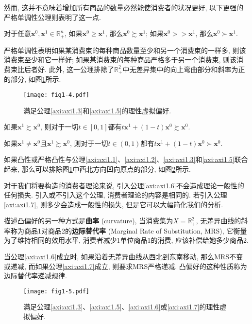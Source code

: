 \documentclass[cn, 12pt, math=mtpro2, bibstyle=apa, blue]{elegantbook}
\newcommand{\R}{\mathbb{R}}
\newcommand{\x}{\mathbf{x}}
\begin{document}
然而, 这并不意味着增加所有商品的数量必然能使消费者的状况更好, 以下更强的严格单调性公理则表明了这一点.

\begin{axiom}[严格单调性]\label{axi:axi1.5}
对于任意$\x^0,\x^1\in\R^n_+$, 如果$\x^0\ge\x^1$, 那么$\x^0\succsim \x^1$; 如果$\x^0>>\x^1$, 那么$\x^0\succ\x^1$.
\end{axiom}
严格单调性表明如果某消费束的每种商品数量至少和另一个消费束的一样多, 则该消费束至少和它一样好; 如果某消费束的每种商品严格多于另一个消费束, 则该消费束比后者好. 此外, 这一公理排除了$\R^2_+$中无差异集中的向上弯曲部分和斜率为正的部分, 如图\ref{fig1.4}所示.

\begin{figure}
  \centering
  \texttt{[image: fig1-4.pdf]}
  \caption{满足公理\ref{axi:axi1.3}和\ref{axi:axi1.5}的理性虚拟偏好.}\label{fig1.4}
\end{figure}

\begin{axiom}[凸性]\label{axi:axi1.6}
如果$\x^1\succsim\x^0$, 则对于一切$t\in[0,1]$都有$t\x^1+(1-t)\x^0\succsim\x^0$.
\end{axiom}
\begin{axiom}[严格凸性]\label{axi:axi1.7}
如果$\x^1\ne\x^0$且$\x^1\succsim\x^0$, 则对于一切$t\in(0,1)$都有$t\x^1+(1-t)\x^0\succ\x^0$.
\end{axiom}

如果凸性或严格凸性与公理\ref{axi:axi1.1}、\ref{axi:axi1.2}、\ref{axi:axi1.3}和\ref{axi:axi1.5}联合起来, 那么可以排除图\ref{fig1.4}中西北方向凹向原点的部分, 如图\ref{fig1.5}所示.

对于我们将要构造的消费者理论来说, 引入公理\ref{axi:axi1.6}不会造成理论一般性的任何损失. 引入或不引入这个公理, 消费者理论的内容是相同的. 若引入公理\ref{axi:axi1.7}, 则多少会造成一般性的损失, 但是它可以大幅简化我们的分析.

描述凸偏好的另一种方式是\textbf{曲率} (curvature), 当消费集为$X=\R^2_+$, 无差异曲线的斜率称为商品1对商品2的\textbf{边际替代率} (Marginal Rate of Substitution, MRS), 它衡量为了维持相同的效用水平, 消费者减少1单位商品1的消费, 应该补偿给她多少商品2.

当公理\ref{axi:axi1.6}成立时, 如果沿着无差异曲线从西北到东南移动, 那么MRS不变或递减, 而如果公理\ref{axi:axi1.7}成立, 则要求MRS严格递减. 凸偏好的这种性质称为边际替代率递减规律.
\begin{figure}
  \centering
  \texttt{[image: fig1-5.pdf]}
  \caption{满足公理\ref{axi:axi1.3}、\ref{axi:axi1.5}、\ref{axi:axi1.6}或\ref{axi:axi1.7}的理性虚拟偏好.}\label{fig1.5}
\end{figure}
\end{document}
